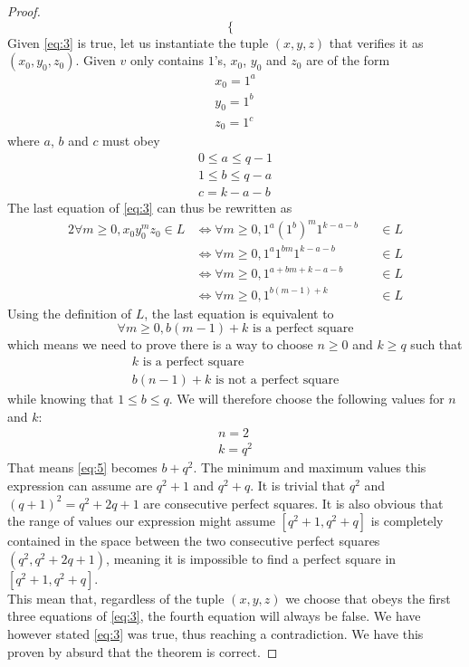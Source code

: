 \documentclass[docid=PA06]{tcom_PA}
\begin{document}
{\begin{proof}
\begin{equation}
\begin{cases}
	\end{cases}
\end{equation}
Given \eqref{eq:3} is true, let us instantiate the tuple $(x,y,z)$ that verifies it as $(x_0,y_0,z_0)$. Given $v$ only contains $1$'s, $x_0$, $y_0$ and $z_0$ are of the form
\begin{gather*}
	x_0=1^a\\
	y_0=1^b\\
	z_0=1^c
\end{gather*}
where $a$, $b$ and $c$ must obey
\begin{gather*}
	0 \leq a \leq q-1\\
	1 \leq b \leq q-a\\
	c = k-a-b
\end{gather*}
The last equation of \eqref{eq:3} can thus be rewritten as
\begin{alignat*}{2}
	\forall m \geq 0, x_0 y_0^m z_0 \in L
	&\iff \forall m \geq 0, 1^a {(1^b)}^m 1^{k-a-b} &&\in L\\
	&\iff \forall m \geq 0, 1^a 1^{bm} 1^{k-a-b}    &&\in L\\
	&\iff \forall m \geq 0, 1^{a+bm+k-a-b}          &&\in L\\
	&\iff \forall m \geq 0, 1^{b(m-1)+k}            &&\in L
\end{alignat*}
Using the definition of $L$, the last equation is equivalent to
\begin{equation*}
	\forall m \geq 0, b(m-1)+k \text{ is a perfect square}\end{equation*}
which means we need to prove there is a way to choose $n \geq 0$ and $k \geq q$ such that
\begin{gather}
	\label{eq:4} k \text{ is a perfect square}\\
	\label{eq:5} b(n-1)+k \text{ is not a perfect square}
\end{gather}
while knowing that $1 \leq b \leq q$.
We will therefore choose the following values for $n$ and $k$:
\begin{gather*}
	n = 2\\
	k = q^2
\end{gather*}
That means \eqref{eq:5} becomes $b+q^2$. The minimum and maximum values this expression can assume are $q^2+1$ and $q^2+q$. It is trivial that $q^2$ and $(q+1)^2=q^2+2q+1$ are consecutive perfect squares. It is also obvious that the range of values our expression might assume $[q^2+1,q^2+q]$ is completely contained in the space between the two consecutive perfect squares $(q^2, q^2+2q+1)$, meaning it is impossible to find a perfect square in $[q^2+1,q^2+q]$.\\
This mean that, regardless of the tuple $(x,y,z)$ we choose that obeys the first three equations of \eqref{eq:3}, the fourth equation will always be false. We have however stated \eqref{eq:3} was true, thus reaching a contradiction. We have this proven by absurd that the theorem is correct.
\end{proof}
}
\end{document}

